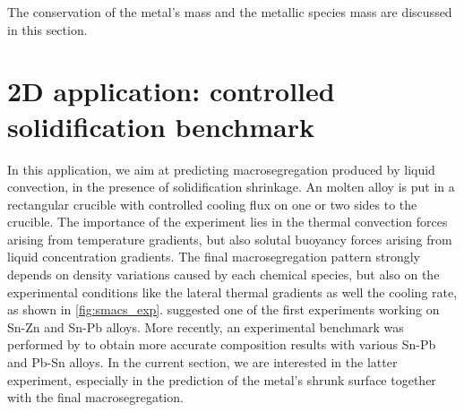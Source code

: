 The conservation of the metal's mass and the metallic species mass are discussed in this section.








\cleardoublepage
\section{2D application: controlled solidification benchmark}
In this application, we aim at predicting macrosegregation produced by liquid convection, in the presence of solidification shrinkage.
An molten alloy is put in a rectangular crucible with controlled cooling flux on one or two sides to the crucible. The importance of the experiment lies in the 
thermal convection forces arising from temperature gradients, but also solutal buoyancy forces arising from liquid concentration gradients. The final macrosegregation pattern
strongly depends on density variations caused by each chemical species, but also on the experimental conditions like the lateral thermal gradients as well the cooling rate,
as shown in \cref{fig:smacs_exp}.
\citet{hebditch_observations_1974} suggested one of the first experiments working on Sn-Zn and Sn-Pb alloys. 
More recently, an experimental benchmark was performed by \citet{hachani_experimental_2012} to obtain more accurate 
composition results with various Sn-Pb and Pb-Sn alloys. In the current section, we are interested in the latter experiment, especially in the prediction
of the metal's shrunk surface together with the final macrosegregation.

